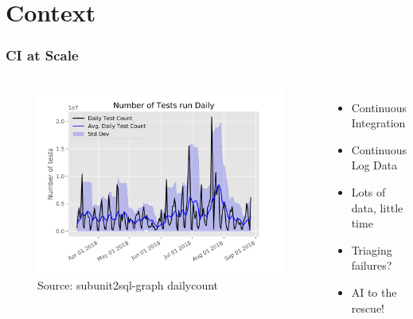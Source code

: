 \documentclass[aspectratio=169,11pt,hyperref={colorlinks=true}]{beamer}
\begin{document}
\section{Context}
\begin{frame}
  \frametitle{CI at Scale}
  \begin{columns}
      \begin{figure}
      \begin{center}
        \includegraphics[width=1\textwidth]{graphs/daily_count.png}
           \caption{Source: subunit2sql-graph dailycount}
      \end{center}
      \end{figure}
      \begin{itemize}
          \item{Continuous Integration}
          \item{Continuous Log Data}
          \item{Lots of data, little time}
          \item{Triaging failures?}
          \item{AI to the rescue!}
      \end{itemize}
  \end{columns}
\end{frame}
\end{document}
